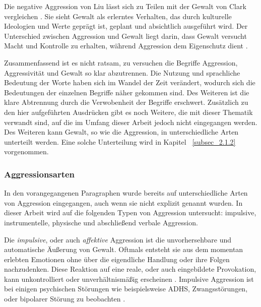 Die negative Aggression von Liu lässt sich zu Teilen mit der Gewalt von Clark vergleichen \parencite{Def_Aggressivität_vs_violence, Aggression}. Sie sieht Gewalt als erlerntes Verhalten, das durch kulturelle Ideologien und Werte geprägt ist, geplant und absichtlich ausgeführt wird. Der Unterschied zwischen Aggression und Gewalt liegt darin, dass Gewalt versucht Macht und Kontrolle zu erhalten, während Aggression dem Eigenschutz dient \parencite{Def_Aggressivität_vs_violence}.

Zusammenfassend ist es nicht ratsam, zu versuchen die Begriffe Aggression, Aggressivität und Gewalt so klar abzutrennen. Die Nutzung und sprachliche Bedeutung der Worte haben sich im Wandel der Zeit verändert, wodurch sich die Bedeutungen der einzelnen Begriffe näher gekommen sind. Des Weiteren ist die klare Abtrennung durch die Verwobenheit der Begriffe erschwert. Zusätzlich zu den hier aufgeführten Ausdrücken gibt es noch Weitere, die mit dieser Thematik verwandt sind, auf die im Umfang dieser Arbeit jedoch nicht eingegangen werden. Des Weiteren kann Gewalt, so wie die Aggression, in unterschiedliche Arten unterteilt werden. Eine solche Unterteilung wird in Kapitel ~\ref{subsec_2.1.2} vorgenommen.



\subsubsection{Aggressionsarten}    \label{subsubsec_2.1.3.1}
In den vorangegangenen Paragraphen wurde bereits auf unterschiedliche Arten von Aggression eingegangen, auch wenn sie nicht explizit genannt wurden. In dieser Arbeit wird auf die folgenden Typen von Aggression untersucht: impulsive, instrumentelle, physische und abschließend verbale Aggression.

Die \textit{impulsive}, oder auch \textit{affektive} Aggression ist die unvorhersehbare und automatische Äußerung von Gewalt. Oftmals entsteht sie aus dem momentan erlebten Emotionen ohne über die eigendliche Handlung oder ihre Folgen nachzudenken. Diese Reaktion auf eine reale, oder auch eingebildete Provokation, kann unkontrolliert oder unverhältnismäßig erscheinen \parencite{impulsive_instrumental_aggro_healtline, impulsive_aggro}. Impulsive Aggression ist bei einigen psychischen Störungen wie beispielsweise ADHS, Zwangsstörungen, oder bipolarer Störung zu beobachten \parencite{impulsive_aggro_psych_Störung}.


